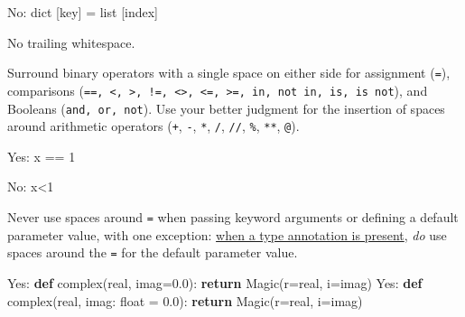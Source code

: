 \documentclass[
]{article}
\newenvironment{Shaded}{}{}
\newcommand{\BuiltInTok}[1]{\textcolor[rgb]{0.00,0.50,0.00}{#1}}
\newcommand{\ControlFlowTok}[1]{\textcolor[rgb]{0.00,0.44,0.13}{\textbf{#1}}}
\newcommand{\DecValTok}[1]{\textcolor[rgb]{0.25,0.63,0.44}{#1}}
\newcommand{\FloatTok}[1]{\textcolor[rgb]{0.25,0.63,0.44}{#1}}
\newcommand{\KeywordTok}[1]{\textcolor[rgb]{0.00,0.44,0.13}{\textbf{#1}}}
\newcommand{\NormalTok}[1]{#1}
\newcommand{\OperatorTok}[1]{\textcolor[rgb]{0.40,0.40,0.40}{#1}}
\newcommand{\StringTok}[1]{\textcolor[rgb]{0.25,0.44,0.63}{#1}}
\begin{document}
\begin{samepage}
\begin{Shaded}
\begin{Highlighting}[]
\NormalTok{No:  }\BuiltInTok{dict}\NormalTok{ [}\StringTok{\textquotesingle{}key\textquotesingle{}}\NormalTok{] }\OperatorTok{=} \BuiltInTok{list}\NormalTok{ [index]}
\end{Highlighting}
\end{Shaded}
\end{samepage}

No trailing whitespace.

Surround binary operators with a single space on either side for
assignment (\texttt{=}), comparisons
(\texttt{==,\ \textless{},\ \textgreater{},\ !=,\ \textless{}\textgreater{},\ \textless{}=,\ \textgreater{}=,\ in,\ not\ in,\ is,\ is\ not}),
and Booleans (\texttt{and,\ or,\ not}). Use your better judgment for the
insertion of spaces around arithmetic operators (\texttt{+}, \texttt{-},
\texttt{*}, \texttt{/}, \texttt{//}, \texttt{\%}, \texttt{**},
\texttt{@}).

\begin{samepage}
\begin{Shaded}
\begin{Highlighting}[]
\NormalTok{Yes: x }\OperatorTok{==} \DecValTok{1}
\end{Highlighting}
\end{Shaded}
\end{samepage}

\begin{samepage}
\begin{Shaded}
\begin{Highlighting}[]
\NormalTok{No:  x}\OperatorTok{\textless{}}\DecValTok{1}
\end{Highlighting}
\end{Shaded}
\end{samepage}

Never use spaces around \texttt{=} when passing keyword arguments or
defining a default parameter value, with one exception:
\hyperref[typing-default-values]{when a type annotation is present},
\emph{do} use spaces around the \texttt{=} for the default parameter
value.

\begin{samepage}
\begin{Shaded}
\begin{Highlighting}[]
\NormalTok{Yes: }\KeywordTok{def} \BuiltInTok{complex}\NormalTok{(real, imag}\OperatorTok{=}\FloatTok{0.0}\NormalTok{): }\ControlFlowTok{return}\NormalTok{ Magic(r}\OperatorTok{=}\NormalTok{real, i}\OperatorTok{=}\NormalTok{imag)}
\NormalTok{Yes: }\KeywordTok{def} \BuiltInTok{complex}\NormalTok{(real, imag: }\BuiltInTok{float} \OperatorTok{=} \FloatTok{0.0}\NormalTok{): }\ControlFlowTok{return}\NormalTok{ Magic(r}\OperatorTok{=}\NormalTok{real, i}\OperatorTok{=}\NormalTok{imag)}
\end{Highlighting}
\end{Shaded}
\end{samepage}
\end{document}
